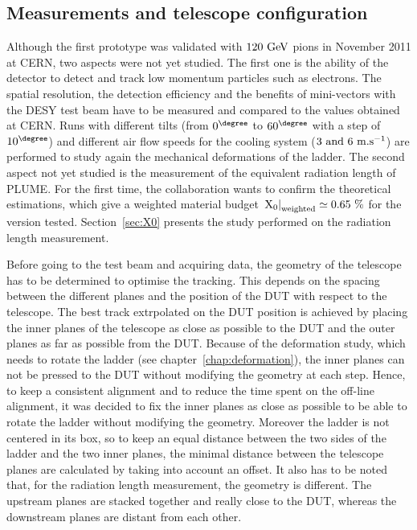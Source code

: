     \subsection{Measurements and telescope configuration}

    Although the first prototype was validated with $120~\rm{GeV}$ pions in November 2011 at CERN, two aspects were not yet studied.
    The first one is the ability of the detector to detect and track low momentum particles such as electrons.
    The spatial resolution, the detection efficiency and the benefits of mini-vectors with the DESY test beam have to be measured and compared to the values obtained at CERN.
    Runs with different tilts (from $0^{\degree}$ to $60^{\degree}$ with a step of $10^{\degree}$) and different air flow speeds for the cooling system ($3~\rm{and}~6~\rm{m.s}^{-1}$) are performed to study again the mechanical deformations of the ladder.
    The second aspect not yet studied is the measurement of the equivalent radiation length of \gls{PLUME}.
    For the first time, the collaboration wants to confirm the theoretical estimations, which give a weighted material budget $\left. \rm{X_{0}}\right|_{\rm{weighted}} \simeq 0.65~\%$ for the version tested.
    Section~\ref{sec:X0} presents the study performed on the radiation length measurement.

    Before going to the test beam and acquiring data, the geometry of the telescope has to be determined to optimise the tracking.
    This depends on the spacing between the different planes and the position of the \gls{DUT} with respect to the telescope.
    The best track extrpolated on the \gls{DUT} position is achieved by placing the inner planes of the telescope as close as possible to the \gls{DUT} and the outer planes as far as possible from the \gls{DUT}.
    Because of the deformation study, which needs to rotate the ladder (see chapter~\ref{chap:deformation}), the inner planes can not be pressed to the \gls{DUT} without modifying the geometry at each step.
    Hence, to keep a consistent alignment and to reduce the time spent on the off-line alignment, it was decided to fix the inner planes as close as possible to be able to rotate the ladder without modifying the geometry.
    Moreover the ladder is not centered in its box, so to keep an equal distance between the two sides of the ladder and the two inner planes, the minimal distance between the telescope planes are calculated by taking into account an offset.
    It also has to be noted that, for the radiation length measurement, the geometry is different.
    The upstream planes are stacked together and really close to the \gls{DUT}, whereas the downstream planes are distant from each other.

